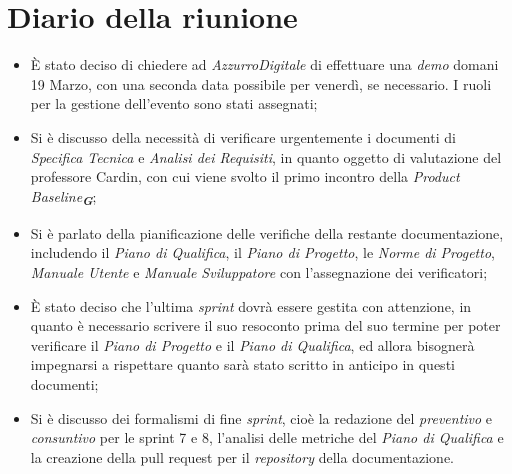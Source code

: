 
\section{Diario della riunione}

\begin{itemize}
    \item È stato deciso di chiedere ad \emph{AzzurroDigitale} di effettuare una \emph{demo} domani 19 Marzo, con una seconda data possibile per venerdì, se necessario. I ruoli per la gestione dell'evento sono stati assegnati;
    \item Si è discusso della necessità di verificare urgentemente i documenti di \emph{Specifica Tecnica} e \emph{Analisi dei Requisiti}, in quanto oggetto di valutazione del professore Cardin, con cui viene svolto il primo incontro della \emph{Product Baseline}\textsubscript{\textbf{\textit{G}}};
    \item Si è parlato della pianificazione delle verifiche della restante documentazione, includendo il \emph{Piano di Qualifica}, il \emph{Piano di Progetto}, le \emph{Norme di Progetto}, \emph{Manuale Utente} e \emph{Manuale Sviluppatore} con l'assegnazione dei verificatori;
    \item È stato deciso che l'ultima \emph{sprint} dovrà essere gestita con attenzione, in quanto è necessario scrivere il suo resoconto prima del suo termine per poter verificare il \emph{Piano di Progetto} e il \emph{Piano di Qualifica}, ed allora bisognerà impegnarsi a rispettare quanto sarà stato scritto in anticipo in questi documenti;
    \item Si è discusso dei formalismi di fine \emph{sprint}, cioè la redazione del \emph{preventivo} e \emph{consuntivo} per le sprint 7 e 8, l'analisi delle metriche del \emph{Piano di Qualifica} e la creazione della pull request per il \emph{repository} della documentazione.
\end{itemize}
